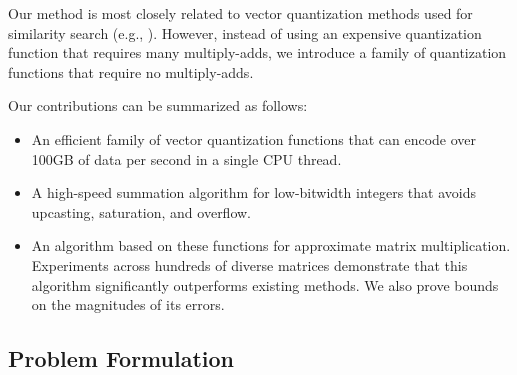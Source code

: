 
Our method is most closely related to vector quantization methods used for similarity search (e.g., \cite{bolt,quickAdc,quickerAdc,pq,opq}). However, instead of using an expensive quantization function that requires many multiply-adds, we introduce a family of quantization functions that require no multiply-adds. %

Our contributions can be summarized as follows:
\vspace{-3mm}
\begin{itemize}\itemsep-1mm
    \item An efficient family of vector quantization functions that can encode over 100GB of data per second in a single CPU thread.
    \item A high-speed summation algorithm for low-bitwidth integers that avoids upcasting, saturation, and overflow.
    \item An algorithm based on these functions for approximate matrix multiplication. Experiments across hundreds of diverse matrices demonstrate that this algorithm significantly outperforms existing methods. We also prove bounds on the magnitudes of its errors.
\end{itemize}
\vspace{-3mm}

\subsection{Problem Formulation} \label{sec:problemStatement}

